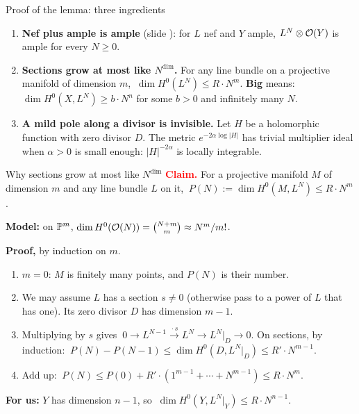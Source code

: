 \begin{frame}{Proof of the lemma: three ingredients}
\label{fr:kv-proof-2}
\begin{enumerate}
\setlength{\itemsep}{9pt}
\item \textbf{Nef plus ample is ample} (slide \hyperlink{fr:kv-nef-ample}{\pageref{fr:kv-nef-ample}}): for \(L\) nef and \(Y\) ample, \(L^N\otimes\mathcal O(Y)\) is ample for every \(N\ge0\).
\item \textbf{Sections grow at most like \(N^{\dim}\).} For any line bundle on a projective manifold of dimension \(m\), \(\ \dim H^0(L^N)\le R\cdot N^m\). \textbf{Big} means: \(\dim H^0(X,L^N)\ge b\cdot N^n\) for some \(b>0\) and infinitely many \(N\).
\item \textbf{A mild pole along a divisor is invisible.} Let \(H\) be a holomorphic function with zero divisor \(D\). The metric \(e^{-2\alpha\log|H|}\) has trivial multiplier ideal when \(\alpha>0\) is small enough: \(|H|^{-2\alpha}\) is locally integrable.
\end{enumerate}
\end{frame}

\begin{frame}{Why sections grow at most like \(N^{\dim}\)}
\label{fr:kv-growth}
\textcolor{red}{\textbf{Claim.}} For a projective manifold \(M\) of dimension \(m\) and any line bundle \(L\) on it, \(\ P(N):=\dim H^0(M,L^N)\le R\cdot N^m\).
\par\smallskip
\textbf{Model:} on \(\mathbb P^m\), \(\dim H^0(\mathcal O(N))=\binom{N+m}{m}\approx N^m/m!\).
\par\smallskip
\textbf{Proof,} by induction on \(m\).
\begin{enumerate}
\setlength{\itemsep}{2pt}
\item \(m=0\): \(M\) is finitely many points, and \(P(N)\) is their number.
\item We may assume \(L\) has a section \(s\ne0\) (otherwise pass to a power of \(L\) that has one). Its zero divisor \(D\) has dimension \(m-1\).
\item Multiplying by \(s\) gives \(\ 0\to L^{N-1}\xrightarrow{\,\cdot s\,}L^N\to L^N|_D\to0\). On sections, by induction: \(\ P(N)-P(N-1)\le\dim H^0(D,L^N|_D)\le R'\cdot N^{m-1}\).
\item Add up: \(\ P(N)\le P(0)+R'\cdot(1^{m-1}+\cdots+N^{m-1})\le R\cdot N^m\).
\end{enumerate}
\textbf{For us:} \(Y\) has dimension \(n-1\), so \(\ \boxed{\dim H^0(Y,L^N|_Y)\le R\cdot N^{n-1}.}\)
\end{frame}


